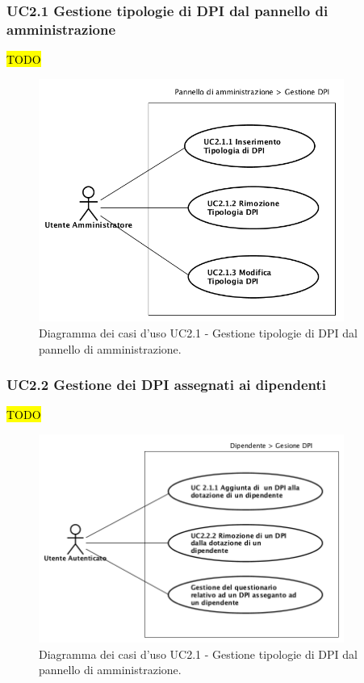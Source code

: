 		\subsubsection{UC2.1 Gestione tipologie di DPI dal pannello di amministrazione }
		\hl{TODO}
			\label{section:UC2_1}
			\begin{figure}[H]
				\begin{center}
					\includegraphics[width=10cm]{Pics/UC2_1GestioneDispositiviDiProtezioneIndividualeDaPannelloDiAmministrazione.png}
					\caption{
						Diagramma dei casi d'uso UC2.1 - Gestione tipologie di DPI dal pannello di amministrazione.}
					\label{fig:UC2_1GestioneDPIAmministrazione}
				\end{center}
			\end{figure}
		
		\subsubsection{UC2.2 Gestione dei DPI assegnati ai dipendenti}
		\hl{TODO}
			\label{section:UC2_2}
			\begin{figure}[H]
				\begin{center}
					\includegraphics[width=10cm]{Pics/UC2_2DPIDipendenti.png}
					\caption{
						Diagramma dei casi d'uso UC2.1 - Gestione tipologie di DPI dal pannello di amministrazione.}
					\label{fig:UC2_2GestioneDPIDipendenti}
				\end{center}
			\end{figure}
